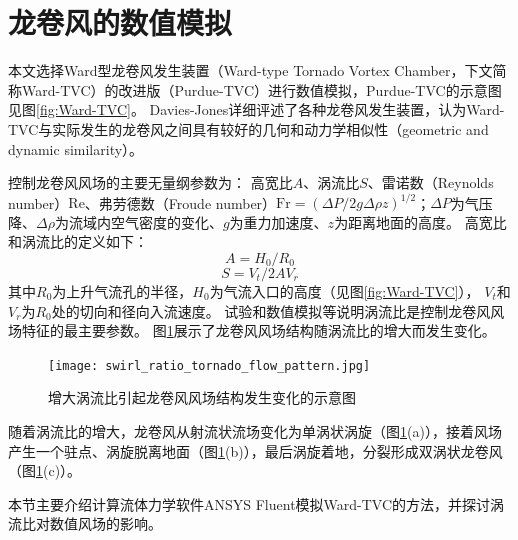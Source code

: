 \section{龙卷风的数值模拟}
本文选择Ward型龙卷风发生装置（Ward-type Tornado Vortex Chamber，下文简称Ward-TVC）\cite{ward1972exploration}的改进版（Purdue-TVC）\cite{church1979characteristics}进行数值模拟，Purdue-TVC的示意图见图\ref{fig:Ward-TVC}。
Davies-Jones\cite{davies1976laboratory}详细评述了各种龙卷风发生装置，认为Ward-TVC与实际发生的龙卷风之间具有较好的几何和动力学相似性（geometric and dynamic similarity）。

控制龙卷风风场的主要无量纲参数为\cite{lewellen1993tornado}：
高宽比$A$、涡流比$S$、雷诺数（Reynolds number）$\mathrm{Re}$、弗劳德数（Froude number）$\mathrm{Fr}=\left( \Delta P/ 2g\Delta \rho z\right)^{1/2}$；$\Delta P$为气压降、$\Delta \rho$为流域内空气密度的变化、$g$为重力加速度、$z$为距离地面的高度。
高宽比和涡流比的定义如下：
\begin{equation}
  A = H_0/R_0
\end{equation}
\begin{equation}
  S = V_t/2A V_r
\end{equation}
其中$R_0$为上升气流孔的半径，$H_0$为气流入口的高度（见图\ref{fig:Ward-TVC}），
$V_t$和$V_r$为$R_0$处的切向和径向入流速度。
试验\cite{ward1972exploration}\cite{church1979characteristics}\cite{snow1982review}和数值模拟\cite{davies1976laboratory}等说明涡流比是控制龙卷风风场特征的最主要参数。
图\ref{fig:swirl}展示了龙卷风风场结构随涡流比的增大而发生变化\cite{hangan2008swirl}。
\begin{figure}[!htbp]
  \centering
  \texttt{[image: swirl\_ratio\_tornado\_flow\_pattern.jpg]}
  \caption{增大涡流比引起龙卷风风场结构发生变化的示意图}\label{fig:swirl}
\end{figure}

随着涡流比的增大，龙卷风从射流状流场变化为单涡状涡旋（图\ref{fig:swirl}(a)），接着风场产生一个驻点、涡旋脱离地面（图\ref{fig:swirl}(b)），最后涡旋着地，分裂形成双涡状龙卷风（图\ref{fig:swirl}(c)）。

本节主要介绍计算流体力学软件ANSYS Fluent模拟Ward-TVC的方法，并探讨涡流比对数值风场的影响。

